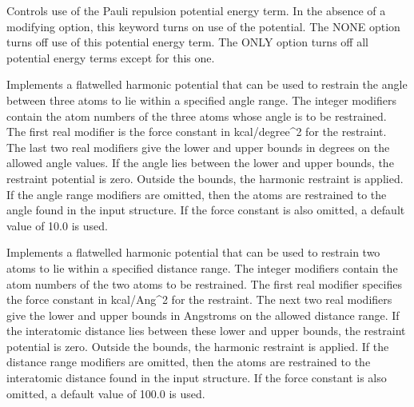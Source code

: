\documentclass[letterpaper,11pt,english]{sphinxmanual}
\begin{document}








  Controls use of the Pauli repulsion potential energy term. In the absence of a modifying option, this keyword turns on use of the potential. The NONE option turns off use of this potential energy term. The ONLY option turns off all potential energy terms except for this one.




  Implements a flat\sphinxhyphen{}welled harmonic potential that can be used to restrain the angle between three atoms to lie within a specified angle range. The integer modifiers contain the atom numbers of the three atoms whose angle is to be restrained.  The first real modifier is the force constant in kcal/degree\textasciicircum{}2 for the restraint. The last two real modifiers give the lower and upper bounds in degrees on the allowed angle values. If the angle lies between the lower and upper bounds, the restraint potential is zero. Outside the bounds, the harmonic restraint is applied. If the angle range modifiers are omitted, then the atoms are restrained to the angle found in the input structure. If the force constant is also omitted, a default value of 10.0 is used.

  Implements a flat\sphinxhyphen{}welled harmonic potential that can be used to restrain two atoms to lie within a specified distance range. The integer modifiers contain the atom numbers of the two atoms to be restrained. The first real modifier specifies the force constant in kcal/Ang\textasciicircum{}2 for the restraint. The next two real modifiers give the lower and upper bounds in Angstroms on the allowed distance range. If the interatomic distance lies between these lower and upper bounds, the restraint potential is zero. Outside the bounds, the harmonic restraint is applied. If the distance range modifiers are omitted, then the atoms are restrained to the interatomic distance found in the input structure. If the force constant is also omitted, a default value of 100.0 is used.
\end{document}

